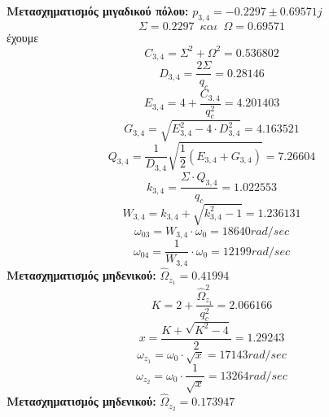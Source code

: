 \documentclass{article}
\begin{document}
{\textbf{Μετασχηματισμός μιγαδικού πόλου:} $p_{3,4} = -0.2297 \pm 0.69571j$ \\
\begin{equation*}
Σ = 0.2297 \enspace και \enspace Ω = 0.69571
\end{equation*}
έχουμε
\begin{equation*}
C_{3,4} = Σ^2 + Ω^2 = 0.536802
\end{equation*}
\begin{equation*}
D_{3,4} = \frac{2Σ}{q_c} = 0.28146
\end{equation*}
\begin{equation*}
E_{3,4} =4+ \frac{C_{3,4}}{q_c^2} = 4.201403
\end{equation*}
\begin{equation*}
G_{3,4} = \sqrt{E_{3,4}^2 - 4 \cdot D_{3,4}^2} = 4.163521
\end{equation*}
\begin{equation*}
Q_{3,4} = \frac{1}{D_{3,4}} \sqrt{\frac{1}{2} (E_{3,4} + G_{3,4})} = 7.26604
\end{equation*}
\begin{equation*}
k_{3,4} = \frac{Σ \cdot Q_{3,4}}{q_c} = 1.022553
\end{equation*}
\begin{equation*}
W_{3,4} = k_{3,4} + \sqrt{k_{3,4}^2 -1} = 1.236131
\end{equation*}
\begin{equation*}
ω_{03} = W_{3,4} \cdot ω_0 =  18640 rad/sec
\end{equation*}
\begin{equation*}
ω_{04} = \frac{1}{W_{3,4}} \cdot ω_0 =  12199 rad/sec
\end{equation*}
\textbf{Μετασχηματισμός μηδενικού:} $\hat{Ω}_{z_1} =0.41994$ \\
\begin{equation*}
K = 2 + \frac{\hat{Ω}_{z_1}^2}{q_c^2} = 2.066166
\end{equation*}
\begin{equation*}
x = \frac{K + \sqrt{K^2-4}}{2} = 1.29243
\end{equation*}
\begin{equation*}
ω_{z_1} = ω_0 \cdot \sqrt{x} =17143 rad/sec
\end{equation*}
\begin{equation*}
ω_{z_2} = ω_0 \cdot \frac{1}{\sqrt{x}} =13264 rad/sec
\end{equation*}
\textbf{Μετασχηματισμός μηδενικού:} $\hat{Ω}_{z_2} = 0.173947$ \\
}
\end{document}
